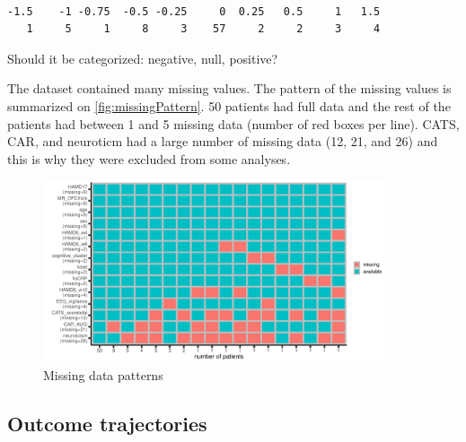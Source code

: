 \documentclass[12pt]{article}
\begin{document}
\label{}
\begin{verbatim}

-1.5    -1 -0.75  -0.5 -0.25     0  0.25   0.5     1   1.5 
   1     5     1     8     3    57     2     2     3     4
\end{verbatim}


Should it be categorized: negative, null, positive?

\vfill

The dataset contained many missing values. The pattern of the missing
values is summarized on \autoref{fig:missingPattern}. 50 patients had
full data and the rest of the patients had between 1 and 5 missing
data (number of red boxes per line). CATS, CAR, and neuroticm had a
large number of missing data (12, 21, and 26) and this is why they
were excluded from some analyses.

\clearpage

\begin{figure}[!h]
\centering
\includegraphics[trim={0 0 0 0},width=0.9\textwidth]{./../figures/gg-missingPattern.pdf}
\caption{\label{fig:missingPattern}Missing data patterns}
\end{figure}

\bigskip
\subsection{Outcome trajectories}
\label{sec:org6231d09}
\end{document}
